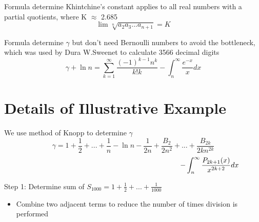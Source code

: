 \documentclass{article}
\begin{document}
\begin{multicols}{3}
            \hspace{-0.5cm}\Large Formula determine Khintchine's constant applies to all real numbers with a partial quotients, where K $\approx$ 2.685 
            \begin{equation*}
                \lim \sqrt[n]{a_2a_3...a_{n+1}}=K
            \end{equation*}

            \hspace{-0.5cm}\Large Formula determine $\gamma$ but don't need Bernoulli numbers to avoid the bottleneck, which was used by Dura W.Sweenet to calculate 3566 decimal digits
            \vspace{-0.3cm}
            \begin{equation*}
                \gamma + \ln{n} = \sum_{k=1}^{\infty} \frac{(-1)^{k-1}n^k}{k!k} - \int_n^\infty\frac{e^{-x}}{x}dx
            \end{equation*}
            



            \vspace{-1cm}
		\section*{Details of Illustrative Example}
            \vspace{-0.5cm}
            \colorbox{marronrp3}{
                \begin{minipage}[t]{.96\linewidth}
                \Large We use method of Knopp to determine $\gamma$		      \begin{equation*}
		        \gamma=1+\frac{1}{2}+...+\frac{1}{n}-\ln{n}-\frac{1}      {2n}+\frac{B_2}{2n^2}+...+\frac{B_{2k}}{2kn^{2k}}
		      \end{equation*}
                \begin{equation*}
                    \hspace{7.5cm}
                     -\int_n^{\infty} \frac{P_{2k+1}(x)}{x^{2k+2}}dx
                \end{equation*}
                \end{minipage}
            }

            \hspace{-0.5cm}\Large   Step 1: Determine sum of $S_{1000} = 1+\frac{1}{2}+...+\frac{1}{1000}$\\
            \vspace{-0.8cm}
            \begin{itemize}
                \item Combine two adjacent terms to reduce the number of times division is performed
                

\end{itemize}
\end{multicols}
\end{document}

